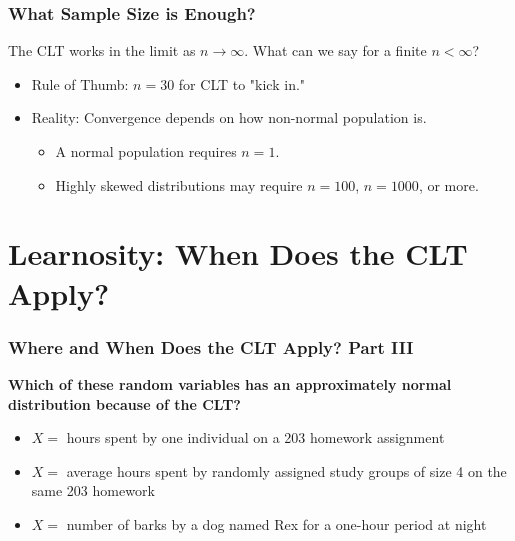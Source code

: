 \documentclass[12pt, block=fill]{beamer}
\begin{document}
\begin{frame}
  \frametitle{What Sample Size is Enough?}
  The CLT works in the limit as
    $n\to\infty$.  What can we say for a finite $n < \infty$?
      
      \begin{itemize}
\item Rule of Thumb: $n=30$ for CLT to "kick in."
\item Reality: Convergence depends on how non-normal population is.
\begin{itemize}
\item A normal population requires $n=1$.
\item Highly skewed distributions may require $n=100$, $n=1000$, or more.
\end{itemize}

\end{itemize}

\end{frame}



\section{Learnosity: When Does the CLT Apply?}

\begin{frame}[t]
  \frametitle{Where and When Does the CLT Apply? Part III} 
  
  \textbf{Which of these random variables has an approximately normal distribution because of the CLT?}
  \begin{itemize}
  \item $X=$ hours spent by one individual on a 203 homework
    assignment
  \item $X=$ average hours spent by randomly assigned study groups of
    size 4 on the same 203 homework
  \item $X=$ number of barks by a dog named Rex for a one-hour
    period at night
  \end{itemize}
\end{frame}
\end{document}
